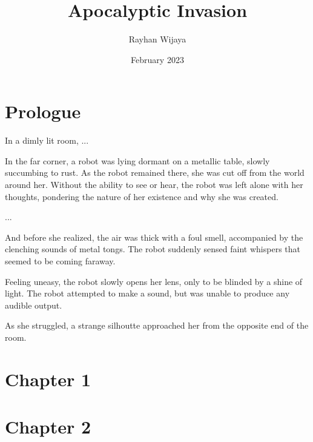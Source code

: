 \documentclass[12pt]{book}
\title{Apocalyptic Invasion}
\author{Rayhan Wijaya}
\date{February 2023}
\begin{document}
\maketitle

\section*{Prologue}

In a dimly lit room, ...

In the far corner, a robot was lying dormant on a metallic table, slowly
succumbing to rust. As the robot remained there, she was cut off from the world
around her. Without the ability to see or hear, the robot was left alone with
her thoughts, pondering the nature of her existence and why she was created.

...

And before she realized, the air was thick with a foul smell, accompanied by
the clenching sounds of metal tongs. The robot suddenly sensed faint whispers
that seemed to be coming faraway.

Feeling uneasy, the robot slowly opens her lens, only to be blinded by a shine
of light. The robot attempted to make a sound, but was unable to produce any
audible output.

As she struggled, a strange silhoutte approached her from the opposite end of
the room.

\section*{Chapter 1}

\section*{Chapter 2}
\end{document}
